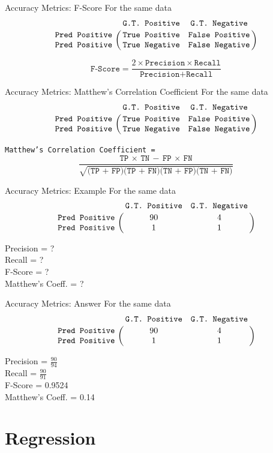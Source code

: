 \documentclass{beamer}
\begin{document}
\begin{frame}{Accuracy Metrics: F-Score}
For the same data
$$
\bordermatrix{&\texttt{G.T. Positive}&\texttt{G.T. Negative}\cr
               \texttt{Pred Positive}&\texttt{True Positive}&\texttt{False Positive}\cr
               \texttt{Pred Positive}&\texttt{True Negative}&\texttt{False Negative}}
$$

$$
\texttt{F-Score} = \frac{2\times\texttt{Precision}\times\texttt{Recall}}{\texttt{Precision} + \texttt{Recall}}
$$


\end{frame}


\begin{frame}{Accuracy Metrics: Matthew's Correlation Coefficient}
For the same data
$$
\bordermatrix{&\texttt{G.T. Positive}&\texttt{G.T. Negative}\cr
               \texttt{Pred Positive}&\texttt{True Positive}&\texttt{False Positive}\cr
               \texttt{Pred Positive}&\texttt{True Negative}&\texttt{False Negative}}
$$

\texttt{Matthew's Correlation Coefficient =}
$$
\frac{\texttt{TP $\times$ TN} - \texttt{FP $\times$ FN}}{\sqrt{\texttt{(TP + FP)(TP + FN)(TN + FP)(TN + FN)}}}
$$
\end{frame}

\begin{frame}{Accuracy Metrics: Example}
For the same data
$$
\bordermatrix{&\texttt{G.T. Positive}&\texttt{G.T. Negative}\cr
               \texttt{Pred Positive}&90&4\cr
               \texttt{Pred Positive}&1&1}
$$

Precision = ?  \\
Recall = ?\\
F-Score = ?\\
Matthew's Coeff. = ?\\
\end{frame}

\begin{frame}{Accuracy Metrics: Answer}
For the same data
$$
\bordermatrix{&\texttt{G.T. Positive}&\texttt{G.T. Negative}\cr
               \texttt{Pred Positive}&90&4\cr
               \texttt{Pred Positive}&1&1}
$$

Precision = $\frac{90}{94}$ \\
Recall = $\frac{90}{91}$ \\
F-Score = 0.9524 \\
Matthew's Coeff. = 0.14
\end{frame}


\section{Regression}
\end{document}
